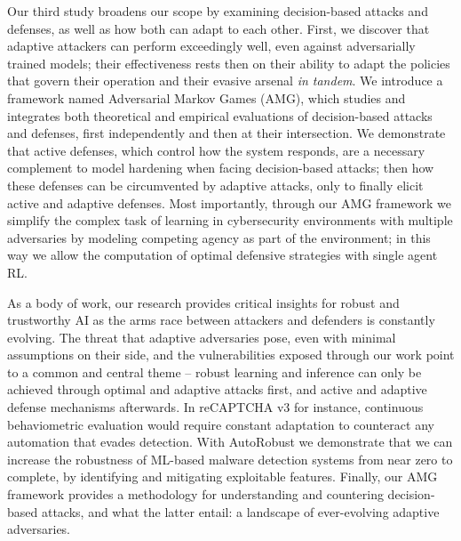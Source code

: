 Our third study broadens our scope by examining decision-based attacks and defenses, as well as how both can adapt to each other.
First, we discover that adaptive attackers can perform exceedingly well, even against adversarially trained models; their effectiveness rests then on their ability to adapt the policies that govern their operation and their evasive arsenal \textit{in tandem}.
We introduce a framework named Adversarial Markov Games (AMG), which studies and integrates both theoretical and empirical evaluations of decision-based attacks and defenses, first independently and then at their intersection.
We demonstrate that active defenses, which control how the system responds, are a necessary complement
to model hardening when facing decision-based attacks; then how these defenses can be circumvented by adaptive attacks, only to finally elicit active and adaptive defenses.
Most importantly, through our AMG framework we simplify the complex task of learning in cybersecurity environments with multiple adversaries by modeling competing agency as part of the environment; in this way we allow the computation of optimal defensive strategies with single agent \gls{RL}.

As a body of work, our research provides critical insights for robust and trustworthy \gls{AI} as the arms race between attackers and defenders is constantly evolving.
The threat that adaptive adversaries pose, even with minimal assumptions on their side, and the vulnerabilities exposed through our work point to a common and central theme -- robust learning and inference can only be achieved through optimal and adaptive attacks first, and active and adaptive defense mechanisms afterwards.
In reCAPTCHA v3 for instance, continuous behaviometric evaluation would require constant adaptation to counteract any automation that evades detection.
With AutoRobust we demonstrate that we can increase the robustness of ML-based malware detection systems from near zero to complete, by identifying and mitigating exploitable features.
Finally, our AMG framework provides a methodology for understanding and countering decision-based attacks,  and what the latter entail: a landscape of ever-evolving adaptive adversaries.

